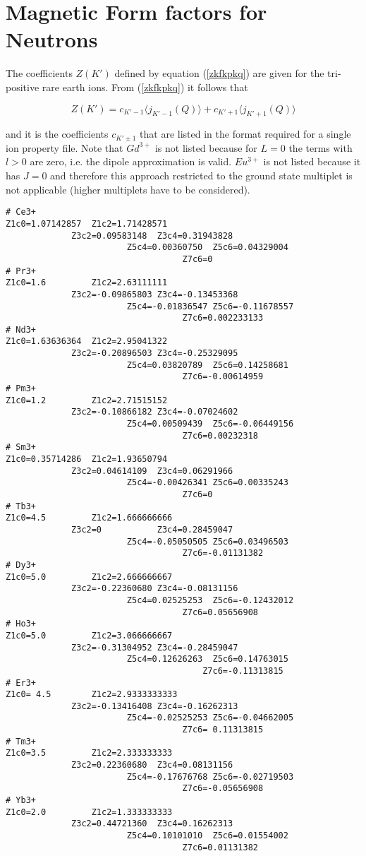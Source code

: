 \section{Magnetic Form factors for Neutrons}\label{zk}

The coefficients $Z(K')$ defined by equation (\ref{zkfkpkq}) are given for 
the tri-positive rare earth ions. From (\ref{zkfkpkq}) it follows that

\begin{equation}
Z(K')=c_{K'-1} \langle j_{K'-1}(Q) \rangle+c_{K'+1} \langle  j_{K'+1}(Q) \rangle 
\end{equation}

and  it is the coefficients $c_{K'\pm 1}$ that are listed in the format required
for a single ion property file. Note that $Gd^{3+}$ is not listed because 
for $L=0$ the terms with $l>0$ are zero, i.e. the dipole approximation is 
valid. $Eu^{3+}$ is not listed because it has $J=0$ and therefore this
approach restricted to the ground state multiplet is not applicable (higher multiplets
have to be considered).


{\footnotesize
\begin{verbatim}
# Ce3+
Z1c0=1.07142857  Z1c2=1.71428571
		     Z3c2=0.09583148  Z3c4=0.31943828 
					    Z5c4=0.00360750  Z5c6=0.04329004 
								   Z7c6=0          
# Pr3+
Z1c0=1.6         Z1c2=2.63111111
		     Z3c2=-0.09865803 Z3c4=-0.13453368
					    Z5c4=-0.01836547 Z5c6=-0.11678557
								   Z7c6=0.002233133
# Nd3+
Z1c0=1.63636364  Z1c2=2.95041322
		     Z3c2=-0.20896503 Z3c4=-0.25329095
					    Z5c4=0.03820789  Z5c6=0.14258681
								   Z7c6=-0.00614959
# Pm3+
Z1c0=1.2         Z1c2=2.71515152 
		     Z3c2=-0.10866182 Z3c4=-0.07024602
					    Z5c4=0.00509439  Z5c6=-0.06449156
								   Z7c6=0.00232318 
# Sm3+
Z1c0=0.35714286  Z1c2=1.93650794 
		     Z3c2=0.04614109  Z3c4=0.06291966
					    Z5c4=-0.00426341 Z5c6=0.00335243
								   Z7c6=0          
# Tb3+
Z1c0=4.5         Z1c2=1.666666666
		     Z3c2=0           Z3c4=0.28459047
					    Z5c4=-0.05050505 Z5c6=0.03496503
								   Z7c6=-0.01131382
# Dy3+
Z1c0=5.0         Z1c2=2.666666667
		     Z3c2=-0.22360680 Z3c4=-0.08131156
					    Z5c4=0.02525253  Z5c6=-0.12432012
								   Z7c6=0.05656908 
# Ho3+
Z1c0=5.0         Z1c2=3.066666667
		     Z3c2=-0.31304952 Z3c4=-0.28459047
					    Z5c4=0.12626263  Z5c6=0.14763015
					    			   Z7c6=-0.11313815
# Er3+
Z1c0= 4.5        Z1c2=2.9333333333
		     Z3c2=-0.13416408 Z3c4=-0.16262313
					    Z5c4=-0.02525253 Z5c6=-0.04662005
								   Z7c6= 0.11313815
# Tm3+
Z1c0=3.5         Z1c2=2.333333333
		     Z3c2=0.22360680  Z3c4=0.08131156
					    Z5c4=-0.17676768 Z5c6=-0.02719503
								   Z7c6=-0.05656908
# Yb3+
Z1c0=2.0         Z1c2=1.333333333
		     Z3c2=0.44721360  Z3c4=0.16262313
					    Z5c4=0.10101010  Z5c6=0.01554002
								   Z7c6=0.01131382 
\end{verbatim}
}